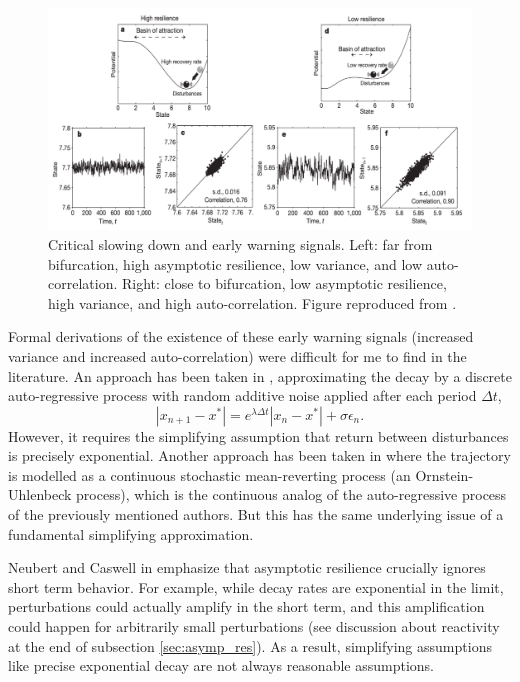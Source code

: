 \begin{figure}[ht]
	\centering
	\captionsetup{width=0.9\linewidth}
	\includegraphics[width=\textwidth]{figs/critical_slowing_down}
	\caption{Critical slowing down and early warning signals. Left: far from bifurcation, high asymptotic resilience, low variance, and low auto-correlation. Right: close to bifurcation, low asymptotic resilience, high variance, and high auto-correlation. Figure reproduced from \cite{schefferEarlywarningSignalsCritical2009a}.}
	
	\label{fig:csd}
\end{figure} 

Formal derivations of the existence of these early warning signals (increased variance and increased auto-correlation) were difficult for me to find in the literature. 
%
An approach has been taken in \cite{schefferCriticalTransitionsNature2009}, approximating the decay by a discrete auto-regressive process with random additive noise applied after each period $\Delta t$,
$$|x_{n+1}-x^{\ast}| = e^{\lambda \Delta t}|x_n-x^{\ast}|+\sigma\epsilon_n.$$
However, it requires the simplifying assumption that return between disturbances is precisely exponential. Another approach has been taken in \cite{ritchieEarlywarningIndicatorsDynamic2016} where the trajectory is modelled as a continuous stochastic mean-reverting process (an Ornstein-Uhlenbeck process), which is the continuous analog of the auto-regressive process of the previously mentioned authors. But this has the same underlying issue of a fundamental simplifying approximation. 

Neubert and Caswell in \cite{neubertAlternativesResilienceMeasuring1997a} emphasize that asymptotic resilience crucially ignores short term behavior. For example, while decay rates are exponential in the limit, perturbations could actually amplify in the short term, and this amplification could happen for arbitrarily small perturbations (see discussion about reactivity at the end of subsection \ref{sec:asymp_res}). As a result, simplifying assumptions like precise exponential decay are not always reasonable assumptions. 

